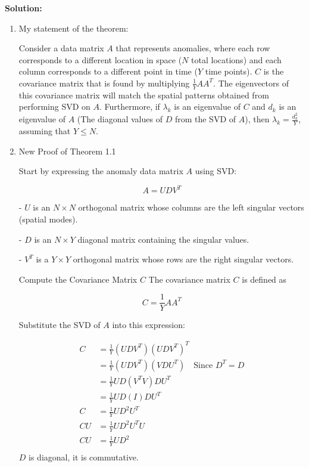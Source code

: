 \documentclass[12pt]{article}
\newenvironment{solution}{
    \textbf{Solution:}
    
}{
    
    \vspace{2em}
}
\begin{document}
\begin{solution}

    \begin{enumerate}[label=\alph*)]
        \item My statement of the theorem:
        
        Consider a data matrix \(A\) that represents anomalies, where each row corresponds to a different location in space (\(N\) total locations) and each column corresponds to a different point in time (\(Y\) time points).
        \(C\) is the covariance matrix that is found by multiplying \(\frac{1}{Y}AA^T\).
        The eigenvectors of this covariance matrix will match the spatial patterns obtained from performing SVD on \(A\).
        Furthermore, if \(\lambda_k\) is an eigenvalue of \(C\) and \(d_k\) is an eigenvalue of \(A\) (The diagonal values of \(D\) from the SVD of \(A\)), then \(\lambda_k = \frac{d_k^2}{Y}\), assuming that \(Y \leq N\).



    \item New Proof of Theorem 1.1
    
    Start by expressing the anomaly data matrix \( A \) using SVD:
    
    \[
    A = UDV^T
    \]
        
    - \( U \) is an \( N \times N \) orthogonal matrix whose columns are the left singular vectors (spatial modes).

    - \( D \) is an \( N \times Y \) diagonal matrix containing the singular values.

    - \( V^T \) is a \( Y \times Y \) orthogonal matrix whose rows are the right singular vectors.
    
    Compute the Covariance Matrix \( C \) The covariance matrix \( C \) is defined as
    
    \[
    C = \frac{1}{Y}AA^T
    \]
    
    Substitute the SVD of \( A \) into this expression:
    
    \[
        \begin{aligned}
            C &= \frac{1}{Y} (UDV^T)(UDV^T)^T \\
            &= \frac{1}{Y} (UDV^T)(VDU^T) \quad \text{Since } D^T = D \\
            &= \frac{1}{Y} UD(V^TV)DU^T \\
            &= \frac{1}{Y} UD(I)DU^T \\
            C &= \frac{1}{Y} UD^2U^T \\
            CU &= \frac{1}{Y} UD^2U^T U \\
            CU &= \frac{1}{Y} UD^2 \\
        \end{aligned}
    \]
    \(D\) is diagonal, it is commutative.
    

\end{enumerate}
\end{solution}
\end{document}
